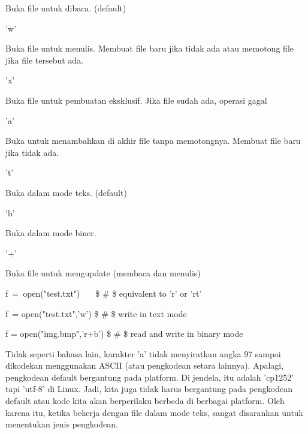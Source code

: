 \noindent 
Buka file untuk dibaca. (default) \par
\vspace{12pt}
\noindent 
'w' \hspace*{0.5in}  \par
\noindent 
Buka file untuk menulis. Membuat file baru jika tidak ada atau memotong file jika file tersebut ada. \par
\vspace{12pt}
\noindent 
'x' \hspace*{0.5in}  \par
\noindent 
Buka file untuk pembuatan eksklusif. Jika file sudah ada, operasi gagal \par
\vspace{12pt}
\noindent 
'a' \hspace*{0.5in}  \par
\noindent 
Buka untuk menambahkan di akhir file tanpa memotongnya. Membuat file baru jika tidak ada. \par
\vspace{12pt}
\noindent 
't' \hspace*{0.5in}  \par
\noindent 
Buka dalam mode teks. (default) \par
\vspace{12pt}
\noindent 
'b' \par
\noindent 
Buka dalam mode biner. \par
\vspace{12pt}
\noindent 
'+' \par
\noindent 
Buka file untuk mengupdate (membaca dan menulis) \par
\vspace{12pt}
\noindent 
f~=~open("test.txt")~~~    \$  \#  \$ equivalent to 'r' or 'rt' \par
\noindent 
f~= open("test.txt",'w')   \$  \#  \$ write in text mode \par
\noindent 
f = open("img.bmp",'r+b')  \$  \#  \$ read and write in binary mode \par
\vspace{12pt}
\noindent 
Tidak seperti bahasa lain, karakter 'a' tidak menyiratkan angka 97 sampai dikodekan menggunakan ASCII (atau pengkodean setara lainnya). Apalagi, pengkodean default bergantung pada platform. Di jendela, itu adalah 'cp1252' tapi 'utf-8' di Linux. Jadi, kita juga tidak harus bergantung pada pengkodean default atau kode kita akan berperilaku berbeda di berbagai platform. Oleh karena itu, ketika bekerja dengan file dalam mode teks, sangat disarankan untuk menentukan jenis pengkodean. \par
